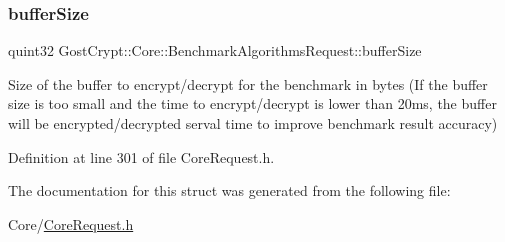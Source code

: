 \subsubsection{\texorpdfstring{buffer\+Size}{bufferSize}}
{\footnotesize\ttfamily quint32 Gost\+Crypt\+::\+Core\+::\+Benchmark\+Algorithms\+Request\+::buffer\+Size}

Size of the buffer to encrypt/decrypt for the benchmark in bytes (If the buffer size is too small and the time to encrypt/decrypt is lower than 20ms, the buffer will be encrypted/decrypted serval time to improve benchmark result accuracy) 

Definition at line 301 of file Core\+Request.\+h.



The documentation for this struct was generated from the following file\+:\begin{DoxyCompactItemize}
\item 
Core/\hyperlink{_core_request_8h}{Core\+Request.\+h}\end{DoxyCompactItemize}
